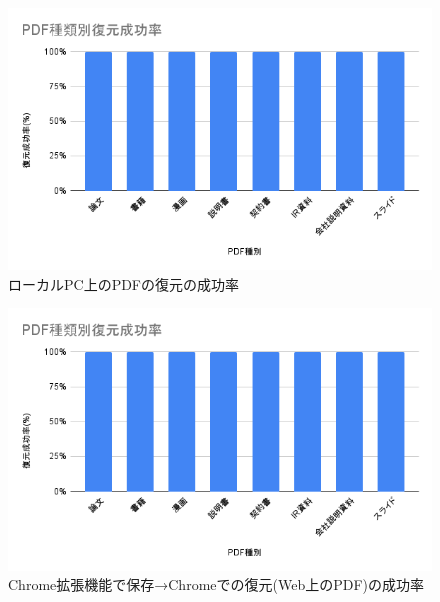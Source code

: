 \begin{figure}[htbp]
  \caption{ローカルPC上のPDFの復元の成功率}
  \label{fig:local-success-rate-pdf}
  \begin{center}
    \includegraphics[bb=0 0 600 371,width=15cm]{img/060_evaluation/success-rate-pdf.pdf}
  \end{center}
\end{figure}

\begin{figure}[htbp]
  \caption{Chrome拡張機能で保存→Chromeでの復元(Web上のPDF)の成功率}
  \label{fig:chrome-chrome-success-rate-pdf}
  \begin{center}
    \includegraphics[bb=0 0 600 371,width=15cm]{img/060_evaluation/success-rate-pdf.pdf}
  \end{center}
\end{figure}

